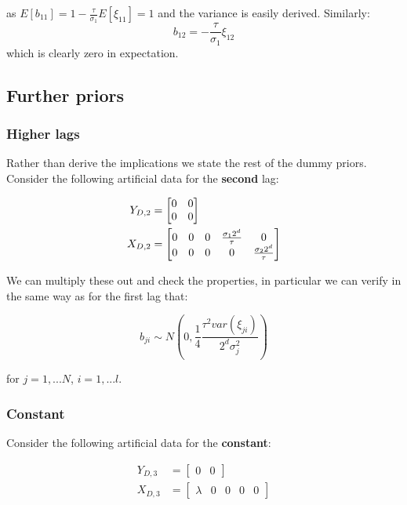 \documentclass[
  letterpaper,
]{book}
\begin{document}
as \(E[b_{11}] = 1 - \frac{\tau}{\sigma_1}E[\xi_{11}] = 1\) and the
variance is easily derived. Similarly: \begin{equation}
  b_{12} = - \frac{\tau}{\sigma_1}\xi_{12}
\end{equation} which is clearly zero in expectation.

\hypertarget{further-priors}{%
\subsection{Further priors}\label{further-priors}}

\hypertarget{higher-lags}{%
\subsubsection{Higher lags}\label{higher-lags}}

Rather than derive the implications we state the rest of the dummy
priors. Consider the following artificial data for the \textbf{second}
lag:

\begin{align*}
  Y_{D,2} &= \left[\begin{matrix}0 & 0 \cr 0 & 0\end{matrix}\right] \\
  X_{D,2} &= \left[\begin{matrix}0 & 0 & 0 & \frac{\sigma_1 2^d}{\tau} & 0 \cr
    0 & 0 & 0 & 0 & \frac{\sigma_2 2^d}{\tau} \end{matrix}\right]
\end{align*}

We can multiply these out and check the properties, in particular we can
verify in the same way as for the first lag that:

\begin{equation}
  b_{ji} \sim N\left(0, \frac{1}{4}\frac{\tau^2var(\xi_{ji})} {2^d\sigma^2_j}\right)
\end{equation}

for \(j=1,...N\), \(i=1,...l\).

\hypertarget{constant}{%
\subsubsection{Constant}\label{constant}}

Consider the following artificial data for the \textbf{constant}:

\begin{align*}
  Y_{D,3} &= \left[\begin{matrix}0 & 0 \end{matrix}\right] \\
  X_{D,3} &= \left[\begin{matrix}\lambda & 0 & 0 & 0 & 0 \end{matrix}\right]
\end{align*}
\end{document}
